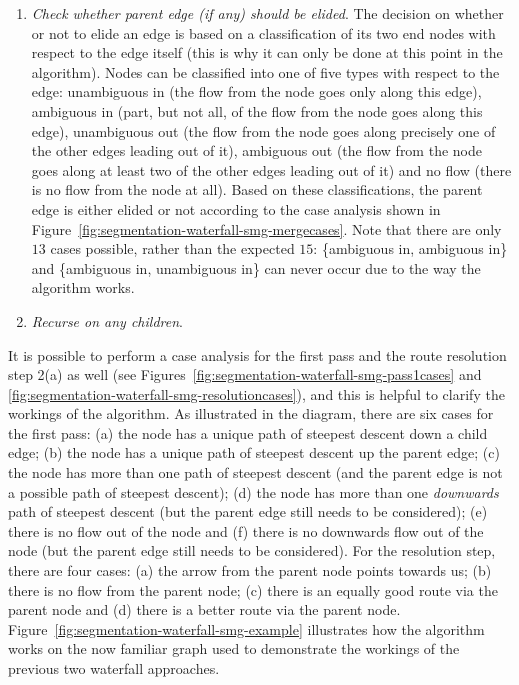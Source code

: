 \begin{enumerate}
\begin{enumerate}
\item \emph{Check whether parent edge (if any) should be elided}. The decision on whether or not to elide an edge is based on a classification of its two end nodes with respect to the edge itself (this is why it can only be done at this point in the algorithm). Nodes can be classified into one of five types with respect to the edge: unambiguous in (the flow from the node goes only along this edge), ambiguous in (part, but not all, of the flow from the node goes along this edge), unambiguous out (the flow from the node goes along precisely one of the other edges leading out of it), ambiguous out (the flow from the node goes along at least two of the other edges leading out of it) and no flow (there is no flow from the node at all). Based on these classifications, the parent edge is either elided or not according to the case analysis shown in Figure~\ref{fig:segmentation-waterfall-smg-mergecases}. Note that there are only $13$ cases possible, rather than the expected $15$: \{ambiguous in, ambiguous in\} and \{ambiguous in, unambiguous in\} can never occur due to the way the algorithm works.

\item \emph{Recurse on any children}.

\end{enumerate}

\end{enumerate}


It is possible to perform a case analysis for the first pass and the route resolution step 2(a) as well (see Figures~\ref{fig:segmentation-waterfall-smg-pass1cases} and \ref{fig:segmentation-waterfall-smg-resolutioncases}), and this is helpful to clarify the workings of the algorithm. As illustrated in the diagram, there are six cases for the first pass: (a) the node has a unique path of steepest descent down a child edge; (b) the node has a unique path of steepest descent up the parent edge; (c) the node has more than one path of steepest descent (and the parent edge is not a possible path of steepest descent); (d) the node has more than one \emph{downwards} path of steepest descent (but the parent edge still needs to be considered); (e) there is no flow out of the node and (f) there is no downwards flow out of the node (but the parent edge still needs to be considered). For the resolution step, there are four cases: (a) the arrow from the parent node points towards us; (b) there is no flow from the parent node; (c) there is an equally good route via the parent node and (d) there is a better route via the parent node. Figure~\ref{fig:segmentation-waterfall-smg-example} illustrates how the algorithm works on the now familiar graph used to demonstrate the workings of the previous two waterfall approaches.

